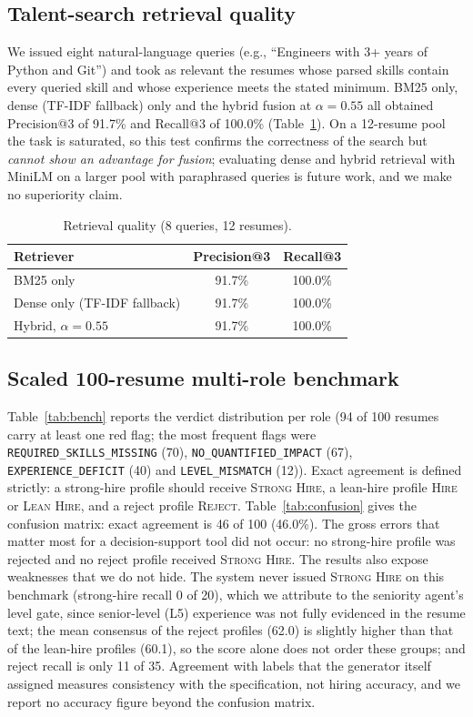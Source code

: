 \documentclass[conference]{IEEEtran}
\newcommand{\verd}[1]{\textsc{#1}}
\newcommand{\flag}[1]{\texttt{\footnotesize #1}}
\newcommand{\Sstrong}{\verd{Strong Hire}}
\newcommand{\Shire}{\verd{Hire}}
\newcommand{\Slean}{\verd{Lean Hire}}
\newcommand{\Sreject}{\verd{Reject}}
\begin{document}
\subsection{Talent-search retrieval quality}
We issued eight natural-language queries (e.g., ``Engineers with 3+ years of Python and Git'') and took as relevant the resumes whose parsed skills contain every queried skill and whose experience meets the stated minimum. BM25 only, dense (TF-IDF fallback) only and the hybrid fusion at $\alpha=0.55$ all obtained Precision@3 of 91.7\% and Recall@3 of 100.0\% (Table~\ref{tab:retrieval}). On a 12-resume pool the task is saturated, so this test confirms the correctness of the search but \emph{cannot show an advantage for fusion}; evaluating dense and hybrid retrieval with MiniLM on a larger pool with paraphrased queries is future work, and we make no superiority claim.

\begin{table}[t]
\caption{Retrieval quality (8 queries, 12 resumes).}
\label{tab:retrieval}
\centering
\footnotesize
\begin{tabular}{@{}lcc@{}}
\toprule
Retriever & Precision@3 & Recall@3 \\
\midrule
BM25 only                         & 91.7\% & 100.0\% \\
Dense only (TF-IDF fallback)      & 91.7\% & 100.0\% \\
Hybrid, $\alpha=0.55$             & 91.7\% & 100.0\% \\
\bottomrule
\end{tabular}
\end{table}

\subsection{Scaled 100-resume multi-role benchmark}
Table~\ref{tab:bench} reports the verdict distribution per role (94 of 100 resumes carry at least one red flag; the most frequent flags were \flag{REQUIRED\_SKILLS\_MISSING} (70), \flag{NO\_QUANTIFIED\_IMPACT} (67), \flag{EXPERIENCE\_DEFICIT} (40) and \flag{LEVEL\_MISMATCH} (12)). Exact agreement is defined strictly: a strong-hire profile should receive \Sstrong{}, a lean-hire profile \Shire{} or \Slean{}, and a reject profile \Sreject{}. Table~\ref{tab:confusion} gives the confusion matrix: exact agreement is 46 of 100 (46.0\%). The gross errors that matter most for a decision-support tool did not occur: no strong-hire profile was rejected and no reject profile received \Sstrong{}. The results also expose weaknesses that we do not hide. The system never issued \Sstrong{} on this benchmark (strong-hire recall 0 of 20), which we attribute to the seniority agent's level gate, since senior-level (L5) experience was not fully evidenced in the resume text; the mean consensus of the reject profiles (62.0) is slightly higher than that of the lean-hire profiles (60.1), so the score alone does not order these groups; and reject recall is only 11 of 35. Agreement with labels that the generator itself assigned measures consistency with the specification, not hiring accuracy, and we report no accuracy figure beyond the confusion matrix.
\end{document}
